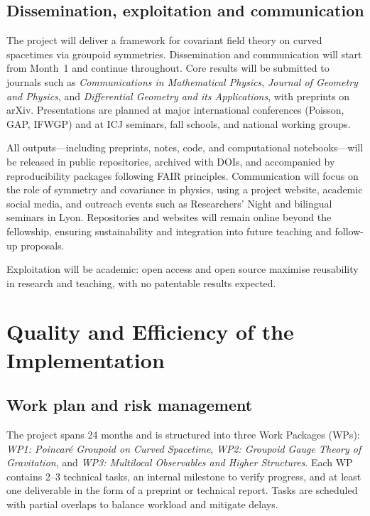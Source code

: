 \documentclass[11pt]{msca-pf}
\begin{document}
\subsection{Dissemination, exploitation and communication}
\label{ssc:impact: outcomes}

The project will deliver a framework for covariant field theory on curved spacetimes via groupoid symmetries. Dissemination and communication will start from Month~1 and continue throughout. Core results will be submitted to journals such as \emph{Communications in Mathematical Physics}, \emph{Journal of Geometry and Physics}, and \emph{Differential Geometry and its Applications}, with preprints on arXiv. Presentations are planned at major international conferences (Poisson, GAP, IFWGP) and at ICJ seminars, fall schools, and national working groups.  

All outputs—including preprints, notes, code, and computational notebooks—will be released in public repositories, archived with DOIs, and accompanied by reproducibility packages following FAIR principles. Communication will focus on the role of symmetry and covariance in physics, using a project website, academic social media, and outreach events such as Researchers’ Night and bilingual seminars in Lyon. Repositories and websites will remain online beyond the fellowship, ensuring sustainability and integration into future teaching and follow-up proposals.  

Exploitation will be academic: open access and open source maximise reusability in research and teaching, with no patentable results expected.


\section{Quality and Efficiency of the Implementation
            }
\label{sc:implementation}

\subsection{Work plan and risk management} \label{ssc:implementation:workplan}
%
The project spans 24 months and is structured into three Work Packages (WPs):  
\emph{WP1: Poincaré Groupoid on Curved Spacetime},  
\emph{WP2: Groupoid Gauge Theory of Gravitation}, and  
\emph{WP3: Multilocal Observables and Higher Structures}.  
Each WP contains 2–3 technical tasks, an internal milestone to verify progress, and at least one deliverable in the form of a preprint or technical report. Tasks are scheduled with partial overlaps to balance workload and mitigate delays.
 
\end{document}
